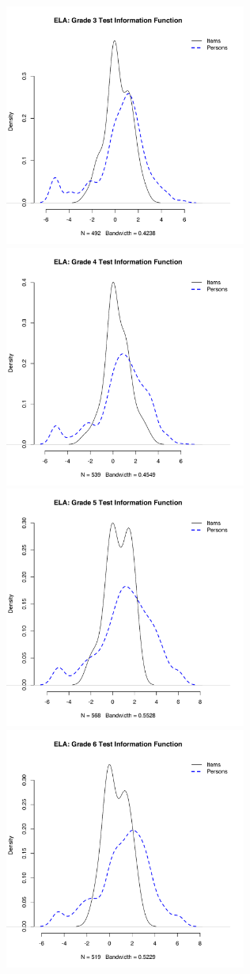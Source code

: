 \documentclass[]{article}
\begin{document}
\includegraphics[width=\textwidth,height=3.125in]{ipdens/ela3ipdens.pdf}
\includegraphics[width=\textwidth,height=3.125in]{ipdens/ela4ipdens.pdf}
\includegraphics[width=\textwidth,height=3.125in]{ipdens/ela5ipdens.pdf}
\includegraphics[width=\textwidth,height=3.125in]{ipdens/ela6ipdens.pdf}
\end{document}
